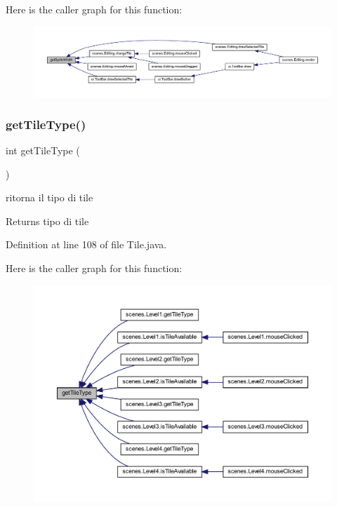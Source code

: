 Here is the caller graph for this function\+:\nopagebreak
\begin{figure}[H]
\begin{center}
\leavevmode
\includegraphics[width=350pt]{classobjects_1_1_tile_a57c0bcd3471b12679b57faa7ba32d91c_icgraph}
\end{center}
\end{figure}
\mbox{\label{classobjects_1_1_tile_a19996fc03739127aa64afbd2f49c2a7c}} 
\subsubsection{\texorpdfstring{get\+Tile\+Type()}{getTileType()}}
{\footnotesize\ttfamily int get\+Tile\+Type (\begin{DoxyParamCaption}{ }\end{DoxyParamCaption})}



ritorna il tipo di tile 

\begin{DoxyReturn}{Returns}
tipo di tile 
\end{DoxyReturn}


Definition at line 108 of file Tile.\+java.

Here is the caller graph for this function\+:\nopagebreak
\begin{figure}[H]
\begin{center}
\leavevmode
\includegraphics[width=350pt]{classobjects_1_1_tile_a19996fc03739127aa64afbd2f49c2a7c_icgraph}
\end{center}
\end{figure}


